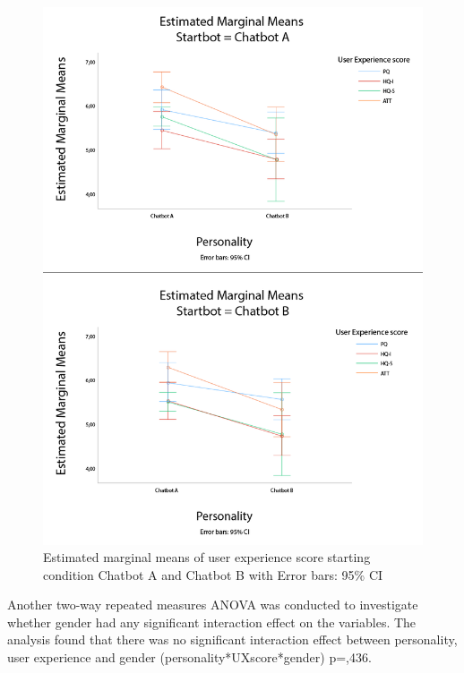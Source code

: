 \begin{figure}[H]
    \centering
    \includegraphics[scale=0.4]{figures/ErrorBarsStartbotAB.png}
    \caption{Estimated marginal means of user experience score starting condition Chatbot A and Chatbot B with Error bars: 95\% CI}
    \label{fig:errorUX}
\end{figure}

Another two-way repeated measures ANOVA was conducted to investigate whether gender had any significant interaction effect on the variables. The analysis found that there was no significant interaction effect between personality, user experience and gender (personality*UXscore*gender) p=,436.

